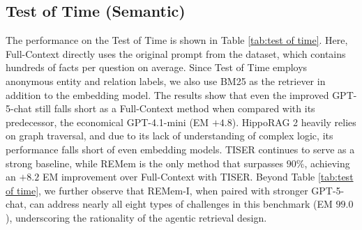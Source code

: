\documentclass{article} %
\newcommand{\ours}{REMem\xspace}
\begin{document}
\subsection{Test of Time (Semantic)}
\label{subsec:results-on-tot}


The performance on the Test of Time is shown in Table \ref{tab:test of time}.
Here, Full-Context directly uses the original prompt from the dataset, which contains hundreds of facts per question on average.
Since Test of Time employs anonymous entity and relation labels, we also use BM25 as the retriever in addition to the embedding model. 
The results show that even the improved GPT-5-chat still falls short as a Full-Context method when compared with its predecessor, the economical GPT-4.1-mini (EM $+4.8$).
HippoRAG 2 heavily relies on graph traversal, and due to its lack of understanding of complex logic, its performance falls short of even embedding models.
TISER continues to serve as a strong baseline, while \ours is the only method that surpasses $90\%$, achieving an $+8.2$ EM improvement over Full-Context with TISER.
Beyond Table \ref{tab:test of time}, we further observe that \ours-I, when paired with stronger GPT-5-chat, can address nearly all eight types of challenges in this benchmark (EM $99.0$), underscoring the rationality of the agentic retrieval design.
\end{document}
